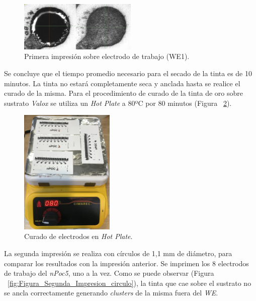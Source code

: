 \begin{figure}[H]
  \centering
    \includegraphics[width=0.5\textwidth]{Figuras/Figura_Primera_impresion_circulo}
  \caption{Primera impresión sobre electrodo de trabajo (WE1).}
  \label{fig:Figura_Primera_impresion_circulo}
\end{figure}

Se concluye que el tiempo promedio necesario para el secado de la tinta es de 10 minutos. La tinta no estará completamente seca y anclada hasta se realice el curado de la misma. Para el procedimiento de curado de la tinta de oro sobre sustrato \textit{Valox} se utiliza un \textit{Hot Plate} a 80ºC por 80 minutos (Figura ~\ref{fig:Figura_Hot_Plate}). 

\begin{figure}[H]
  \centering
    \includegraphics[width=0.4\textwidth]{Figuras/Figura_Hot_Plate}
  \caption{Curado de electrodos en \textit{Hot Plate}.}
  \label{fig:Figura_Hot_Plate}
\end{figure}

La segunda impresión se realiza con círculos de 1,1 mm de diámetro, para comparar los resultados con la impresión anterior. Se imprimen los 8 electrodos de trabajo del \textit{nPoc5}, uno a la vez. Como se puede observar (Figura ~\ref{fig:Figura_Segunda_Impresion_circulo}), la tinta que cae sobre el sustrato no se ancla correctamente generando \textit{clusters} de la misma fuera del \emph{WE}.

